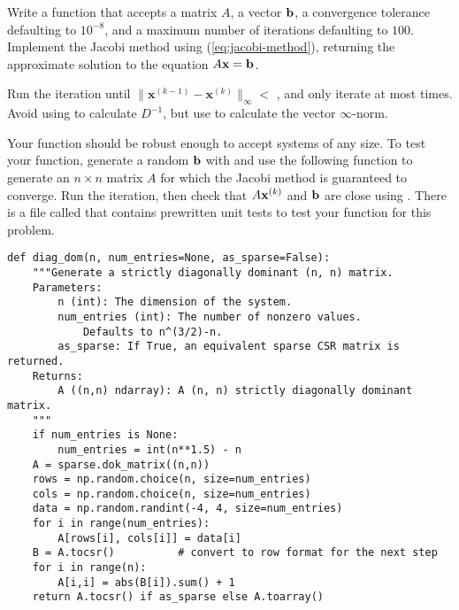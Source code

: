 \begin{problem} %
Write a function that accepts a matrix $A$, a vector $\mathbf{b}$, a convergence tolerance  defaulting to $10^{-8}$, and a maximum number of iterations  defaulting to $100$.
Implement the Jacobi method using (\ref{eq:jacobi-method}), returning the approximate solution to the equation $A\mathbf{x} = \mathbf{b}$.

Run the iteration until $\|\mathbf{x}^{(k-1)} - \mathbf{x}^{(k)}\|_{\infty} <$ , and only iterate at most  times.
Avoid using  to calculate $D^{-1}$, but use  to calculate the vector $\infty$-norm.

%

Your function should be robust enough to accept systems of any size.
To test your function, generate a random $\mathbf{b}$ with  and use the following function to generate an $n\times n$ matrix $A$ for which the Jacobi method is guaranteed to converge.
Run the iteration, then check that $A\mathbf{x}^{(k)}$ and $\mathbf{b}$ are close using .
There is a file called  that contains prewritten unit tests to test your function for this problem.

\begin{comment} We have to create the strictly diagonally dominant matrix as a sparse 
    matrix in order to be more efficient, but we need to be able to use this as a regular 
    ndarray or a CSR sparse matrix depending solely on whether we're using it in problen 4 
    or not, I thought this might be a good solution using the code provided from GitHub. 
    See code for method diag_dom() in problem 1.
\end{comment}

\begin{lstlisting}
def diag_dom(n, num_entries=None, as_sparse=False):
    """Generate a strictly diagonally dominant (n, n) matrix.
    Parameters:
        n (int): The dimension of the system.
        num_entries (int): The number of nonzero values.
            Defaults to n^(3/2)-n.
        as_sparse: If True, an equivalent sparse CSR matrix is returned.
    Returns:
        A ((n,n) ndarray): A (n, n) strictly diagonally dominant matrix.
    """
    if num_entries is None:
        num_entries = int(n**1.5) - n
    A = sparse.dok_matrix((n,n))
    rows = np.random.choice(n, size=num_entries)
    cols = np.random.choice(n, size=num_entries) 
    data = np.random.randint(-4, 4, size=num_entries)
    for i in range(num_entries):
        A[rows[i], cols[i]] = data[i]
    B = A.tocsr()          # convert to row format for the next step
    for i in range(n):
        A[i,i] = abs(B[i]).sum() + 1
    return A.tocsr() if as_sparse else A.toarray()
\end{lstlisting}


\end{problem}
